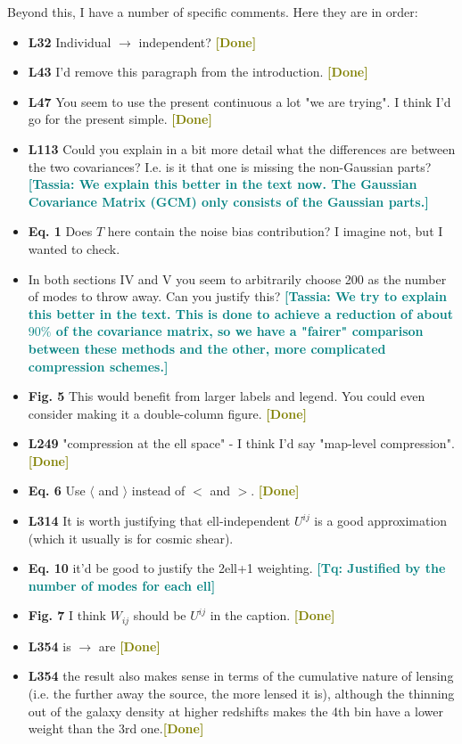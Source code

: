 \documentclass{article}
\newcommand\tassia[1]{{\bf {\textcolor{teal}{[Tassia: #1]}}}}
\newcommand\tq[1]{{\bf {\textcolor{teal}{[Tq: #1]}}}}
\newcommand\done{{\bf {\textcolor{olive}{[Done]}}}}
\begin{document}
	Beyond this, I have a number of specific comments. Here they are in order:
	\begin{itemize}
	\item \textbf{L32} Individual $\rightarrow$ independent? \done
	\item \textbf{L43} I'd remove this paragraph from the introduction. \done
	\item \textbf{L47} You seem to use the present continuous a lot "we are trying". I think I'd go for the present simple. \done
	\item \textbf{L113} Could you explain in a bit more detail what the differences are between the two covariances? I.e. is it that one is missing the non-Gaussian parts? \tassia{We explain this better in the text now. The Gaussian Covariance Matrix (GCM) only consists of the Gaussian parts.}
	\item \textbf{Eq. 1} Does $T$ here contain the noise bias contribution? I imagine not, but I wanted to check.
	\item In both sections IV and V you seem to arbitrarily choose 200 as the number of modes to throw away. Can you justify this? \tassia{We try to explain this better in the text. This is done to achieve a reduction of about $90\%$ of the covariance matrix, so we have a "fairer" comparison between these methods and the other, more complicated compression schemes.}
	\item \textbf{Fig. 5} This would benefit from larger labels and legend. You could even consider making it a double-column figure. \done
	\item \textbf{L249} "compression at the ell space" - I think I'd say "map-level compression". \done
	\item \textbf{Eq. 6} Use $\langle$ and $\rangle$ instead of $<$ and $>$. \done
	\item \textbf{L314} It is worth justifying that ell-independent $U^{ij}$ is a good approximation (which it usually is for cosmic shear).
	\item \textbf{Eq. 10} it'd be good to justify the 2ell+1 weighting. \tq{Justified by the number of modes for each ell}
	\item \textbf{Fig. 7} I think $W_{ij}$ should be $U^{ij}$ in the caption. \done
	\item \textbf{L354} is $\rightarrow$ are \done
	\item \textbf{L354} the result also makes sense in terms of the cumulative nature of lensing (i.e. the further away the source, the more lensed it is), although the thinning out of the galaxy density at higher redshifts makes the 4th bin have a lower weight than the 3rd one.\done

\end{itemize}
\end{document}
